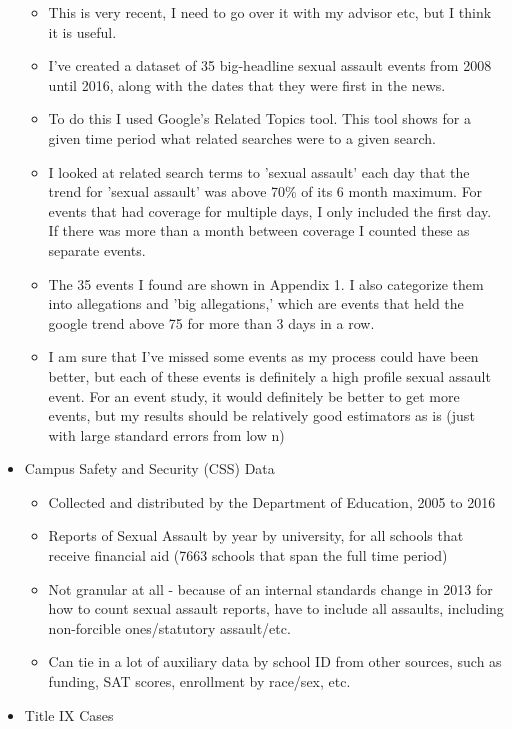 \documentclass[AER,draftmode]{AEA}
\begin{document}
\begin{itemize}
    \begin{itemize}
        \item This is very recent, I need to go over it with my advisor etc, but I think it is useful. 
        \item I've created a dataset of 35 big-headline sexual assault events from 2008 until 2016, along with the dates that they were first in the news.
        \item To do this I used Google's Related Topics tool. This tool shows for a given time period what related searches were to a given search.
        \item I looked at related search terms to 'sexual assault' each day that the trend for 'sexual assault' was above 70\% of its 6 month maximum. For events that had coverage for multiple days, I only included the first day. If there was more than a month between coverage I counted these as separate events. 
        \item The 35 events I found are shown in Appendix 1. I also categorize them into allegations and 'big allegations,' which are events that held the google trend above 75 for more than 3 days in a row. 
        \item I am sure that I've missed some events as my process could have been better, but each of these events is definitely a high profile sexual assault event. For an event study, it would definitely be better to get more events, but my results should be relatively good estimators as is (just with large standard errors from low n)
    \end{itemize}
    \item Campus Safety and Security (CSS) Data
    \begin{itemize}
        \item Collected and distributed by the Department of Education, 2005 to 2016
        \item Reports of Sexual Assault by year by university, for all schools that receive financial aid (7663 schools that span the full time period)
        \item Not granular at all - because of an internal standards change in 2013 for how to count sexual assault reports, have to include all assaults, including non-forcible ones/statutory assault/etc.
        \item Can tie in a lot of auxiliary data by school ID from other sources, such as funding, SAT scores, enrollment by race/sex, etc.
    \end{itemize}
    \item Title IX Cases

\end{itemize}
\end{document}
